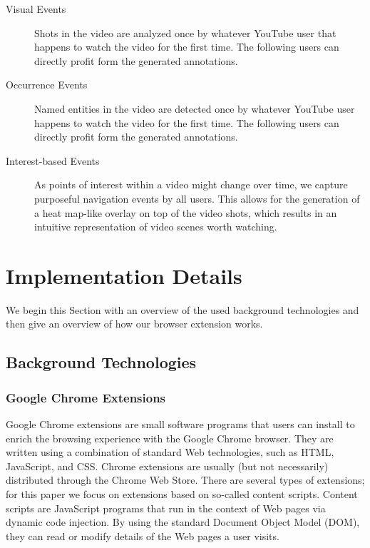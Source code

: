 \documentclass[runningheads,a4paper]{llncs}
\begin{document}
\begin{description}
  \item[Visual Events] Shots in the video are analyzed once by whatever YouTube user that happens to watch the video for the first time. The following users can directly profit form the generated annotations.
  \item[Occurrence Events] Named entities in the video are detected once by whatever YouTube user happens to watch the video for the first time. The following users can directly profit form the generated annotations.
  \item[Interest-based Events] As points of interest within a video might change over time, we capture purposeful navigation events by all users. This allows for the generation of a heat map-like overlay on top of the video shots, which results in an intuitive representation of video scenes worth watching.
\end{description} 

\section{Implementation Details} \label{sec:implementation}
We begin this Section with an overview of the used background technologies and then give an overview of how our browser extension works.

\subsection{Background Technologies}

\subsubsection{Google Chrome Extensions}
Google Chrome extensions are small software programs that users can install to enrich the browsing experience with the Google Chrome browser. They are written using a combination of standard Web technologies, such as HTML, JavaScript, and CSS. Chrome extensions are usually (but not necessarily) distributed through the Chrome Web Store. There are several types of extensions; for this paper we focus on extensions based on so-called content scripts. Content scripts are JavaScript programs that run in the context of Web pages via dynamic code injection. By using the standard Document Object Model (DOM), they can read or modify details of the Web pages a user visits.
\end{document}
